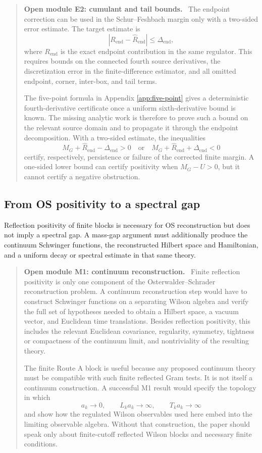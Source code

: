 \documentclass[11pt]{article}
\newenvironment{openmodule}[1]
{\begin{quote}\color{red!55!black}\textbf{Open module #1.}\ }
{\end{quote}}
\begin{document}
\begin{openmodule}{E2: cumulant and tail bounds}
The endpoint correction can be used in the Schur--Feshbach margin only with a two-sided error estimate.  The target estimate is
\[
  |R_{\mathrm{end}}-\widehat R_{\mathrm{end}}|
  \le \Delta_{\mathrm{end}},
\]
where \(R_{\mathrm{end}}\) is the exact endpoint contribution in the same regulator.  This requires bounds on the connected fourth source derivatives, the discretization error in the finite-difference estimator, and all omitted endpoint, corner, inter-box, and tail terms.

The five-point formula in Appendix \ref{app:five-point} gives a deterministic fourth-derivative certificate once a uniform sixth-derivative bound is known.  The missing analytic work is therefore to prove such a bound on the relevant source domain and to propagate it through the endpoint decomposition.  With a two-sided estimate, the inequalities
\[
  M_G+\widehat R_{\mathrm{end}}-\Delta_{\mathrm{end}}>0
  \quad\text{or}\quad
  M_G+\widehat R_{\mathrm{end}}+\Delta_{\mathrm{end}}<0
\]
certify, respectively, persistence or failure of the corrected finite margin.  A one-sided lower bound can certify positivity when \(M_G-U>0\), but it cannot certify a negative obstruction.
\end{openmodule}

\subsection{From OS positivity to a spectral gap}

Reflection positivity of finite blocks is necessary for OS reconstruction but does not imply a spectral gap.  A mass-gap argument must additionally produce the continuum Schwinger functions, the reconstructed Hilbert space and Hamiltonian, and a uniform decay or spectral estimate in that same theory.

\begin{openmodule}{M1: continuum reconstruction}
Finite reflection positivity is only one component of the Osterwalder--Schrader reconstruction problem.  A continuum reconstruction step would have to construct Schwinger functions on a separating Wilson algebra and verify the full set of hypotheses needed to obtain a Hilbert space, a vacuum vector, and Euclidean time translations.  Besides reflection positivity, this includes the relevant Euclidean covariance, regularity, symmetry, tightness or compactness of the continuum limit, and nontriviality of the resulting theory.

The finite Route A block is useful because any proposed continuum theory must be compatible with such finite reflected Gram tests.  It is not itself a continuum construction.  A successful M1 result would specify the topology in which
\[
  a_k\to0,\qquad L_ka_k\to\infty,\qquad T_ka_k\to\infty
\]
and show how the regulated Wilson observables used here embed into the limiting observable algebra.  Without that construction, the paper should speak only about finite-cutoff reflected Wilson blocks and necessary finite conditions.
\end{openmodule}
\end{document}
